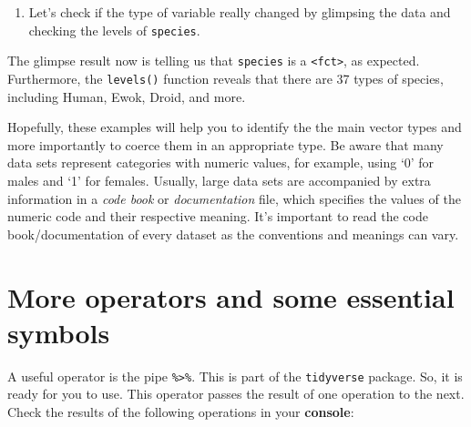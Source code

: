 \documentclass[
]{book}
\newenvironment{Shaded}{\begin{snugshade}}{\end{snugshade}}
\newcommand{\FunctionTok}[1]{\textcolor[rgb]{0.13,0.29,0.53}{\textbf{#1}}}
\newcommand{\NormalTok}[1]{#1}
\newcommand{\OtherTok}[1]{\textcolor[rgb]{0.56,0.35,0.01}{#1}}
\newcommand{\SpecialCharTok}[1]{\textcolor[rgb]{0.81,0.36,0.00}{\textbf{#1}}}
\providecommand{\tightlist}{%
  \setlength{\itemsep}{0pt}\setlength{\parskip}{0pt}}
\begin{document}
\begin{Shaded}
\end{Shaded}

\begin{enumerate}
\def\labelenumi{\arabic{enumi}.}
\setcounter{enumi}{6}
\tightlist
\item
  Let's check if the type of variable really changed by glimpsing the data and checking the levels of \texttt{species}.
\end{enumerate}

\begin{Shaded}
\end{Shaded}

The glimpse result now is telling us that \texttt{species} is a \texttt{\textless{}fct\textgreater{}}, as expected. Furthermore, the \texttt{levels()} function reveals that there are 37 types of species, including Human, Ewok, Droid, and more.

Hopefully, these examples will help you to identify the the main vector types and more importantly to coerce them in an appropriate type. Be aware that many data sets represent categories with numeric values, for example, using `0' for males and `1' for females. Usually, large data sets are accompanied by extra information in a \emph{code book} or \emph{documentation} file, which specifies the values of the numeric code and their respective meaning. It's important to read the code book/documentation of every dataset as the conventions and meanings can vary.

\hypertarget{more-operators-and-some-essential-symbols}{%
\section{More operators and some essential symbols}\label{more-operators-and-some-essential-symbols}}

A useful operator is the pipe \texttt{\%\textgreater{}\%}. This is part of the \texttt{tidyverse} package. So, it is ready for you to use. This operator passes the result of one operation to the next. Check the results of the following operations in your \textbf{console}:
\end{document}

